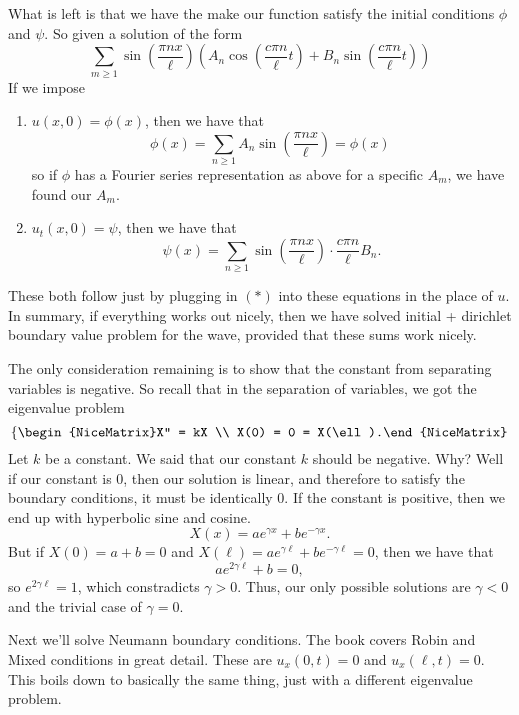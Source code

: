 What is left is that we have the make our function satisfy the initial conditions \( \phi \) and \( \psi \). So given a solution of the form
\[ \tag{\( * \)}\sum_{m \ge 1}  \sin \left( \frac{\pi n x}{\ell} \right) \left( A_{n} \cos \left( \frac{c \pi n}{\ell}t \right) + B_{n} \sin \left( \frac{c \pi n}{\ell}t \right) \right) \]
If we impose
\begin{enumerate}

	\item \( u(x, 0) = \phi(x) \), then we have that 
		\[ \phi(x) = \sum_{n \ge 1} A_{n} \sin \left( \frac{\pi n x}{\ell} \right) = \phi(x)\ \]
		so if \( \phi \) has a Fourier series representation as above for a specific \( A_{m} \), we have found our \( A_{m} \).
	\item \( u_{t}(x, 0) = \psi \), then we have that
		\[ \psi(x) = \sum_{n \ge 1} \sin \left( \frac{\pi n x}{\ell} \right) \cdot \frac{c \pi n}{\ell} B_{n}. \]

\end{enumerate}
These both follow just by plugging in \( (*) \) into these equations in the place of \( u \). In summary, if everything works out nicely, then we have solved initial + dirichlet boundary value problem for the wave, provided that these sums work nicely.

The only consideration remaining is to show that the constant from separating variables is negative. So recall that in the separation of variables, we got the eigenvalue problem
\[ \left\{\begin{NiceMatrix}X'' = kX \\ X(0) = 0 = X(\ell).\end{NiceMatrix}\right.  \]
Let \( k \) be a constant. We said that our constant \( k \) should be negative. Why? Well if our constant is \( 0 \), then our solution is linear, and therefore to satisfy the boundary conditions, it must be identically \( 0 \). If the constant is positive, then we end up with hyperbolic sine and cosine.
\[ X(x) = a e^{\gamma x} + b e^{- \gamma x}. \]
But if \( X(0) = a + b = 0 \) and \( X(\ell) = ae^{\gamma \ell} + b e^{- \gamma \ell} = 0 \), then we have that
\[ a e^{2 \gamma \ell} + b = 0, \]
so \( e^{2 \gamma \ell} = 1 \), which constradicts \( \gamma > 0 \). Thus, our only possible solutions are \( \gamma < 0 \) and the trivial case of \( \gamma = 0 \).

Next we'll solve Neumann boundary conditions. The book covers Robin and Mixed conditions in great detail. These are \( u_{x}(0, t) = 0 \) and \( u_{x}(\ell, t) = 0 \). This boils down to basically the same thing, just with a different eigenvalue problem.

